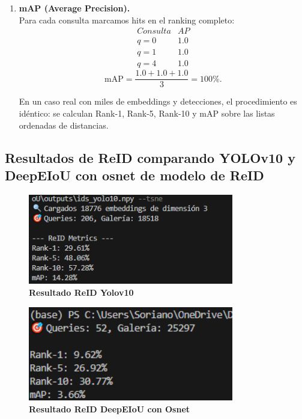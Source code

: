 \documentclass[12pt, a4paper, twoside]{article}
\begin{document}
\begin{enumerate}
 		\item \textbf{mAP (Average Precision).}\\
 		Para cada consulta marcamos hits en el ranking completo:
 		\[
 		\begin{array}{l|c}
 			Consulta & AP \\ \hline
 			q=0 & 1.0 \\
 			q=1 & 1.0 \\
 			q=4 & 1.0
 		\end{array}
 		\]
 		\[
 		\mathrm{mAP} = \frac{1.0 + 1.0 + 1.0}{3} = 100\%.
 		\]
 		
 		En un caso real con miles de embeddings y detecciones, el procedimiento es idéntico: 
 		se calculan Rank-1, Rank-5, Rank-10 y mAP sobre las listas ordenadas de distancias.
 	\end{enumerate}
 	
 	\subsection{Resultados de ReID comparando YOLOv10 y DeepEIoU con osnet de modelo de ReID}
 	
 	\begin{figure}[H]
 		\centering
 		\includegraphics[width=0.8\textwidth]{image/metricas_reid_yolo10}
 		\caption{\textbf{Resultado ReID Yolov10}}
 		\label{fig:Resultado Yolov10 reid}
 	\end{figure}
 	
 	\begin{figure}[H]
 		\centering
 		\includegraphics[width=0.8\textwidth]{image/metricas_reid_deepEIoU}
 		\caption{\textbf{Resultado ReID DeepEIoU con Osnet}}
 		\label{fig:Resultado DeepEIoU con Osnet reid}
 	\end{figure}
 	
\end{document}
